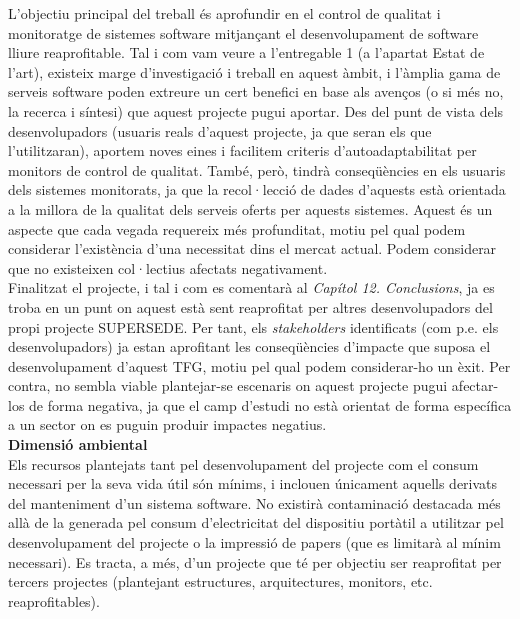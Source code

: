 \noindent L’objectiu principal del treball és aprofundir en el control de qualitat i monitoratge de sistemes software mitjançant el desenvolupament de software lliure reaprofitable. Tal i com vam veure a l’entregable 1 (a l’apartat Estat de l’art), existeix marge d’investigació i treball en aquest àmbit, i l’àmplia gama de serveis software poden extreure un cert benefici en base als avenços (o si més no, la recerca i síntesi) que aquest projecte pugui aportar. Des del punt de vista dels desenvolupadors (usuaris reals d’aquest projecte, ja que seran els que l’utilitzaran), aportem noves eines i facilitem criteris d’autoadaptabilitat per monitors de control de qualitat. També, però, tindrà conseqüències en els usuaris dels sistemes monitorats, ja que la recol·lecció de dades d’aquests està orientada a la millora de la qualitat dels serveis oferts per aquests sistemes. Aquest és un aspecte que cada vegada requereix més profunditat, motiu pel qual podem considerar l’existència d’una necessitat dins el mercat actual. Podem considerar que no existeixen col·lectius afectats negativament.\\

Finalitzat el projecte, i tal i com es comentarà al \textit{Capítol 12. Conclusions}, ja es troba en un punt on aquest està sent reaprofitat per altres desenvolupadors del propi projecte SUPERSEDE. Per tant, els \textit{stakeholders} identificats (com p.e. els desenvolupadors) ja estan aprofitant les conseqüències d'impacte que suposa el desenvolupament d'aquest TFG, motiu pel qual podem considerar-ho un èxit. Per contra, no sembla viable plantejar-se escenaris on aquest projecte pugui afectar-los de forma negativa, ja que el camp d'estudi no està orientat de forma específica a un sector on es puguin produir impactes negatius.\\

\noindent \textbf{\large Dimensió ambiental}\\

\noindent Els recursos plantejats tant pel desenvolupament del projecte com el consum necessari per la seva vida útil són mínims, i inclouen únicament aquells derivats del manteniment d’un sistema software. No existirà contaminació destacada més allà de la generada pel consum d’electricitat del dispositiu portàtil a utilitzar pel desenvolupament del projecte o la impressió de papers (que es limitarà al mínim necessari). Es tracta, a més, d’un projecte que té per objectiu ser reaprofitat per tercers projectes (plantejant estructures, arquitectures, monitors, etc. reaprofitables).\\

